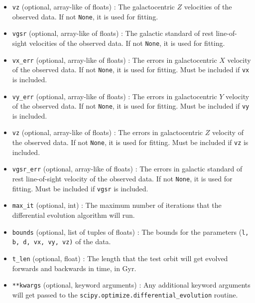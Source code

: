 \documentclass{article}
\begin{document}
\begin{itemize}
\begin{itemize}
\item \verb!vz! (optional, array-like of floats) : The galactocentric $Z$ velocities of the observed data. If not \verb!None!, it is used for fitting. 

\item \verb!vgsr! (optional, array-like of floats) : The galactic standard of rest line-of-sight velocities of the observed data. If not \verb!None!, it is used for fitting. 

\item \verb!vx_err! (optional, array-like of floats) : The errors in galactocentric $X$ velocity of the observed data. If not \verb!None!, it is used for fitting. Must be included if \verb!vx! is included. 

\item \verb!vy_err! (optional, array-like of floats) : The errors in galactocentric $Y$ velocity of the observed data. If not \verb!None!, it is used for fitting. Must be included if \verb!vy! is included. 

\item \verb!vz! (optional, array-like of floats) : The errors in galactocentric $Z$ velocity of the observed data. If not \verb!None!, it is used for fitting. Must be included if \verb!vz! is included. 

\item \verb!vgsr_err! (optional, array-like of floats) : The errors in galactic standard of rest line-of-sight velocity of the observed data. If not \verb!None!, it is used for fitting. Must be included if \verb!vgsr! is included.

\item \verb!max_it! (optional, int) : The maximum number of iterations that the differential evolution algorithm will run. 

\item \verb!bounds! (optional, list of tuples of floats) : The bounds for the parameters (\verb!l, b, d, vx, vy, vz)! of the data. 

\item \verb!t_len! (optional, float) : The length that the test orbit will get evolved forwards and backwards in time, in Gyr. 

\item \verb!**kwargs! (optional, keyword arguments) : Any additional keyword arguments will get passed to the \verb!scipy.optimize.differential_evolution! routine. 

\end{itemize}


\end{itemize}
\end{document}
